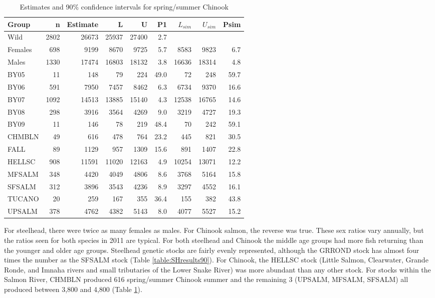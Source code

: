 \documentclass[11pt]{article}
\begin{document}
\begin{table}
\caption{Estimates and 90\% confidence intervals for spring/summer Chinook}
\label{table:CHresults90} 
\begin{center}
\begin{tabular}{|l|r|r|r|r|r|r|r|r|}
\hline Group & n & Estimate & L & U & P1 & $L_{sim}$ & $U_{sim}$ & Psim \\ 
\hline  Wild&2802&26673  &25937 &27400  &2.7 &  &  & \\ 
\hline  Females&698&9199  &8670  &9725  &5.7 &8583  &9823  &6.7 \\ 
\hline  Males&1330&17474  &16803  &18132  &3.8 &16636  &18314  &4.8 \\ 
\hline  BY05&11&148  &79  &224  &49.0 &72  &248  & 59.7\\ 
\hline  BY06&591&7950  &7457  &8462  &6.3 &6734  &9370  &16.6 \\ 
\hline  BY07&1092&14513  &13885  &15140  &4.3 &12538  &16765  &14.6 \\ 
\hline  BY08&298& 3916 &3564  &4269  &9.0 &3219  &4727  & 19.3 \\ 
\hline  BY09&11&146  &78  &219  &48.4 &70  &242  &59.1 \\ 
\hline  CHMBLN&49&616  &478  &764  &23.2 &445  &821  &30.5 \\ 
\hline  FALL&89&1129  &957  &1309  &15.6 &891  &1407  &22.8 \\ 
\hline  HELLSC&908&11591  &11020  &12163  &4.9 &10254  &13071  & 12.2\\ 
\hline  MFSALM&348&4420  &4049  &4806  &8.6 &3768  &5164  &15.8 \\ 
\hline  SFSALM&312&3896  &3543  &4236  &8.9 &3297  &4552  &16.1 \\ 
\hline  TUCANO&20&259  &167 &355  &36.4 &155  &382  &43.8 \\ 
\hline  UPSALM&378&4762  &4382  &5143  &8.0 &4077  &5527  &15.2 \\ 
\hline 
\end{tabular}
\end{center}
\end{table}

For steelhead, there were twice as many females as males. For Chinook salmon, the reverse was true. These sex ratios vary annually, but the ratios seen for both species in 2011 are typical. For both steelhead and Chinook the middle age groups had more fish returning than the younger and older age groups. Steelhead genetic stocks are fairly evenly represented, although the GRROND stock has almost four times the number as the SFSALM stock (Table \ref{table:SHresults90}). For Chinook, the HELLSC stock (Little Salmon, Clearwater, Grande Ronde, and Imnaha rivers and small tributaries of the Lower Snake River) was more abundant than any other stock. For stocks within the Salmon River, CHMBLN produced 616 spring/summer Chinook summer and the remaining 3 (UPSALM, MFSALM, SFSALM) all produced between 3,800 and 4,800 (Table \ref{table:CHresults90}). 
\end{document}
